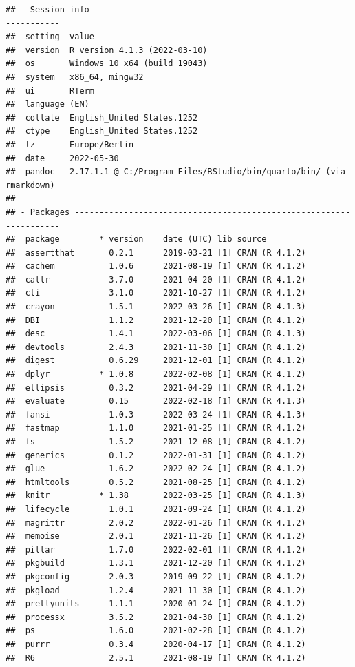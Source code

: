 \documentclass[10,a4paperpaper,]{article}
\begin{document}
\FloatBarrier

\begin{verbatim}
## - Session info ---------------------------------------------------------------
##  setting  value
##  version  R version 4.1.3 (2022-03-10)
##  os       Windows 10 x64 (build 19043)
##  system   x86_64, mingw32
##  ui       RTerm
##  language (EN)
##  collate  English_United States.1252
##  ctype    English_United States.1252
##  tz       Europe/Berlin
##  date     2022-05-30
##  pandoc   2.17.1.1 @ C:/Program Files/RStudio/bin/quarto/bin/ (via rmarkdown)
## 
## - Packages -------------------------------------------------------------------
##  package        * version    date (UTC) lib source
##  assertthat       0.2.1      2019-03-21 [1] CRAN (R 4.1.2)
##  cachem           1.0.6      2021-08-19 [1] CRAN (R 4.1.2)
##  callr            3.7.0      2021-04-20 [1] CRAN (R 4.1.2)
##  cli              3.1.0      2021-10-27 [1] CRAN (R 4.1.2)
##  crayon           1.5.1      2022-03-26 [1] CRAN (R 4.1.3)
##  DBI              1.1.2      2021-12-20 [1] CRAN (R 4.1.2)
##  desc             1.4.1      2022-03-06 [1] CRAN (R 4.1.3)
##  devtools         2.4.3      2021-11-30 [1] CRAN (R 4.1.2)
##  digest           0.6.29     2021-12-01 [1] CRAN (R 4.1.2)
##  dplyr          * 1.0.8      2022-02-08 [1] CRAN (R 4.1.2)
##  ellipsis         0.3.2      2021-04-29 [1] CRAN (R 4.1.2)
##  evaluate         0.15       2022-02-18 [1] CRAN (R 4.1.3)
##  fansi            1.0.3      2022-03-24 [1] CRAN (R 4.1.3)
##  fastmap          1.1.0      2021-01-25 [1] CRAN (R 4.1.2)
##  fs               1.5.2      2021-12-08 [1] CRAN (R 4.1.2)
##  generics         0.1.2      2022-01-31 [1] CRAN (R 4.1.2)
##  glue             1.6.2      2022-02-24 [1] CRAN (R 4.1.2)
##  htmltools        0.5.2      2021-08-25 [1] CRAN (R 4.1.2)
##  knitr          * 1.38       2022-03-25 [1] CRAN (R 4.1.3)
##  lifecycle        1.0.1      2021-09-24 [1] CRAN (R 4.1.2)
##  magrittr         2.0.2      2022-01-26 [1] CRAN (R 4.1.2)
##  memoise          2.0.1      2021-11-26 [1] CRAN (R 4.1.2)
##  pillar           1.7.0      2022-02-01 [1] CRAN (R 4.1.2)
##  pkgbuild         1.3.1      2021-12-20 [1] CRAN (R 4.1.2)
##  pkgconfig        2.0.3      2019-09-22 [1] CRAN (R 4.1.2)
##  pkgload          1.2.4      2021-11-30 [1] CRAN (R 4.1.2)
##  prettyunits      1.1.1      2020-01-24 [1] CRAN (R 4.1.2)
##  processx         3.5.2      2021-04-30 [1] CRAN (R 4.1.2)
##  ps               1.6.0      2021-02-28 [1] CRAN (R 4.1.2)
##  purrr            0.3.4      2020-04-17 [1] CRAN (R 4.1.2)
##  R6               2.5.1      2021-08-19 [1] CRAN (R 4.1.2)

\end{verbatim}
\end{document}
